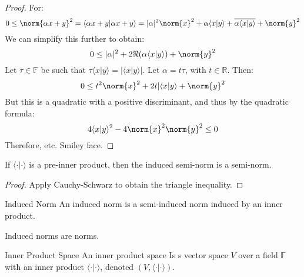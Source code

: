         \begin{proof}
            For:
            \begin{equation}
                0\leq\norm{\alpha{x}+y}^{2}
                =\langle{\alpha{x}+y|\alpha{x}+y}\rangle
                =|\alpha|^{2}\norm{x}^{2}
                +\alpha\langle{x|y}\rangle
                +\overline{\alpha\langle{x|y}\rangle}+\norm{y}^{2}
            \end{equation}
            We can simplify this further to obtain:
            \begin{equation}
                0\leq|\alpha|^{2}+2\Re(\alpha\langle{x|y}\rangle)
                    +\norm{y}^{2}
            \end{equation}
            Let $\tau\in\mathbb{F}$ be such that
            $\tau\langle{x|y}\rangle=|\langle{x|y}\rangle|$.
            Let $\alpha=t\tau$, with $t\in\mathbb{R}$. Then:
            \begin{equation}
                0\leq{t}^{2}\norm{x}^{2}+2t|\langle{x|y}\rangle
                    +\norm{y}^{2}
            \end{equation}
            But this is a quadratic with a positive discriminant,
            and thus by the quadratic formula:
            \begin{equation}
                4\langle{x|y}\rangle^{2}-4\norm{x}^{2}\norm{y}^{2}
                \leq{0}
            \end{equation}
            Therefore, etc. Smiley face.
        \end{proof}
        \begin{theorem}
            If $\langle{\cdot|\cdot}\rangle$ is a pre-inner
            product, then the induced semi-norm is a semi-norm.
        \end{theorem}
        \begin{proof}
            Apply Cauchy-Schwarz to obtain the triangle inequality.
        \end{proof}
        \begin{ldefinition}{Induced Norm}
            An induced norm is a semi-induced norm induced
            by an inner product.
        \end{ldefinition}
        \begin{theorem}
            Induced norms are norms.
        \end{theorem}
        \begin{ldefinition}{Inner Product Space}
            An inner product space Is s vector space
            $V$ over a field $\mathbb{F}$ with an
            inner product $\langle{\cdot|\cdot}\rangle$,
            denoted $(V,\langle{\cdot|\cdot}\rangle)$.
        \end{ldefinition}
